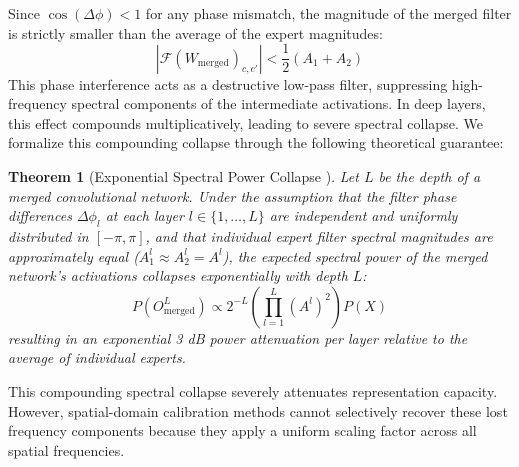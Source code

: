 \documentclass{article}
\theoremstyle{plain}
\newtheorem{theorem}{Theorem}[section]
\theoremstyle{definition}
\theoremstyle{remark}
\begin{document}
Since $\cos(\Delta\phi) < 1$ for any phase mismatch, the magnitude of the merged filter is strictly smaller than the average of the expert magnitudes:
\begin{equation}
    |\mathcal{F}(W_{\text{merged}})_{c,c'}| < \frac{1}{2}(A_1 + A_2)
\end{equation}
This phase interference acts as a destructive low-pass filter, suppressing high-frequency spectral components of the intermediate activations. In deep layers, this effect compounds multiplicatively, leading to severe spectral collapse. We formalize this compounding collapse through the following theoretical guarantee:

\begin{theorem}[Exponential Spectral Power Collapse \cite{fdsa2026}]
Let $L$ be the depth of a merged convolutional network. Under the assumption that the filter phase differences $\Delta\phi_l$ at each layer $l \in \{1, \dots, L\}$ are independent and uniformly distributed in $[-\pi, \pi]$, and that individual expert filter spectral magnitudes are approximately equal ($A^l_1 \approx A^l_2 = A^l$), the expected spectral power of the merged network's activations collapses exponentially with depth $L$:
\begin{equation}
    P(O^L_{\text{merged}}) \propto 2^{-L} \left( \prod_{l=1}^L (A^l)^2 \right) P(X)
\end{equation}
resulting in an exponential 3 dB power attenuation per layer relative to the average of individual experts.
\end{theorem}

This compounding spectral collapse severely attenuates representation capacity. However, spatial-domain calibration methods cannot selectively recover these lost frequency components because they apply a uniform scaling factor across all spatial frequencies.
\end{document}
